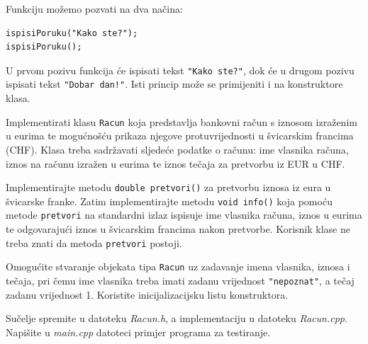 Funkciju možemo pozvati na dva načina:
\begin{verbatim}
ispisiPoruku("Kako ste?");
ispisiPoruku();
\end{verbatim}

U prvom pozivu funkcija će ispisati tekst \texttt{"Kako ste?"}, dok će u drugom pozivu ispisati tekst 
\texttt{"Dobar dan!"}.
Isti princip može se primijeniti i na konstruktore klasa.


\begin{zadatak}\label{zad:racuni}
    Implementirati klasu \texttt{Racun} koja predstavlja bankovni račun s iznosom izraženim u eurima te mogućnošću prikaza njegove protuvrijednosti u švicarskim francima (CHF).
    Klasa treba sadržavati sljedeće podatke o računu:
    ime vlasnika računa, iznos na računu izražen u eurima te iznos tečaja za pretvorbu iz EUR u CHF.
    
    Implementirajte metodu
    \texttt{double pretvori()}
    za pretvorbu iznosa iz eura u švicarske franke.
    Zatim implementirajte metodu
    \texttt{void info()} koja pomoću metode \texttt{pretvori} na standardni izlaz ispisuje ime vlasnika računa, iznos u eurima te
    odgovarajući iznos u švicarskim francima nakon pretvorbe.
    Korisnik klase ne treba znati da metoda \texttt{pretvori} postoji.
    
    Omogućite stvaranje objekata tipa \texttt{Racun} uz zadavanje imena vlasnika, iznosa i tečaja, pri čemu ime vlasnika treba imati zadanu vrijednost 
    \texttt{"nepoznat"}, a tečaj zadanu vrijednost 1.
    Koristite inicijalizacijsku listu konstruktora.

    Sučelje spremite u datoteku \textit{Racun.h},
    a implementaciju u datoteku \textit{Racun.cpp}.
    Napišite u \textit{main.cpp} datoteci
    primjer programa za testiranje.
\end{zadatak}


